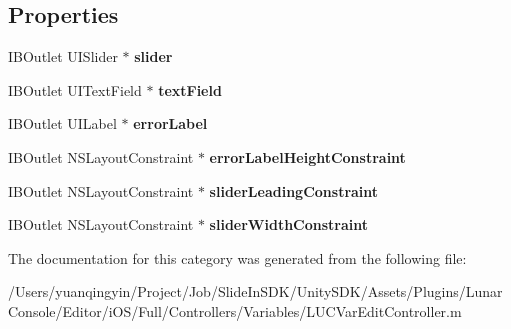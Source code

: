 \subsection*{Properties}
\begin{DoxyCompactItemize}
\item 
\mbox{\label{category_l_u_c_var_edit_controller_07_08_a51dd3ebfef7c48a68320552af299cb24}} 
I\+B\+Outlet U\+I\+Slider $\ast$ {\bfseries slider}
\item 
\mbox{\label{category_l_u_c_var_edit_controller_07_08_a6b12a924b221b4248d4868e191c8604a}} 
I\+B\+Outlet U\+I\+Text\+Field $\ast$ {\bfseries text\+Field}
\item 
\mbox{\label{category_l_u_c_var_edit_controller_07_08_abf33ed500ec556f1017d31cbe44d34b9}} 
I\+B\+Outlet U\+I\+Label $\ast$ {\bfseries error\+Label}
\item 
\mbox{\label{category_l_u_c_var_edit_controller_07_08_ad733e16203543ebb3bf8b7118f308461}} 
I\+B\+Outlet N\+S\+Layout\+Constraint $\ast$ {\bfseries error\+Label\+Height\+Constraint}
\item 
\mbox{\label{category_l_u_c_var_edit_controller_07_08_a2ecdf4267e6d98ee4ec29fb4c894c3e7}} 
I\+B\+Outlet N\+S\+Layout\+Constraint $\ast$ {\bfseries slider\+Leading\+Constraint}
\item 
\mbox{\label{category_l_u_c_var_edit_controller_07_08_a0305638a25e9793f291f42c852c3763d}} 
I\+B\+Outlet N\+S\+Layout\+Constraint $\ast$ {\bfseries slider\+Width\+Constraint}
\end{DoxyCompactItemize}


The documentation for this category was generated from the following file\+:\begin{DoxyCompactItemize}
\item 
/\+Users/yuanqingyin/\+Project/\+Job/\+Slide\+In\+S\+D\+K/\+Unity\+S\+D\+K/\+Assets/\+Plugins/\+Lunar\+Console/\+Editor/i\+O\+S/\+Full/\+Controllers/\+Variables/L\+U\+C\+Var\+Edit\+Controller.\+m\end{DoxyCompactItemize}

